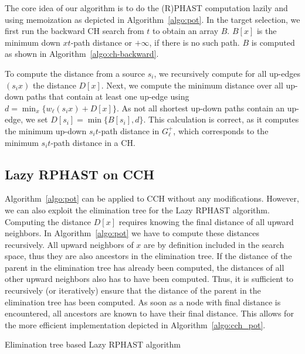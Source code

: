 \documentclass[a4paper,UKenglish,cleveref, autoref, thm-restate]{lipics-v2021}
\begin{document}
The core idea of our algorithm is to do the (R)PHAST computation lazily and using memoization as depicted in Algorithm~\ref{algo:pot}.
In the target selection, we first run the backward CH search from $t$ to obtain an array $B$.
$B[x]$ is the minimum down $xt$-path distance or $+\infty$, if there is no such path.
$B$ is computed as shown in Algorithm~\ref{algo:ch-backward}.

To compute the distance from a source $s_i$, we recursively compute for all up-edges $(s_i x)$ the distance $D[x]$.
Next, we compute the minimum distance over all up-down paths that contain at least one up-edge using $d = \min_x\{w_\ell(s_i x) + D[x]\}$.
As not all shortest up-down paths contain an up-edge, we set $D[s_i] = \min \{ B[s_i], d \}$.
This calculation is correct, as it computes the minimum up-down $s_it$-path distance in $G^+_\ell$, which corresponds to the minimum $s_it$-path distance in a CH.

\subsection{Lazy RPHAST on CCH}

Algorithm~\ref{algo:pot} can be applied to CCH without any modifications.
However, we can also exploit the elimination tree for the Lazy RPHAST algorithm.
Computing the distance $D[x]$ requires knowing the final distance of all upward neighbors.
In Algorithm~\ref{algo:pot} we have to compute these distances recursively.
All upward neighbors of $x$ are by definition included in the search space, thus they are also ancestors in the elimination tree.
If the distance of the parent in the elimination tree has already been computed, the distances of all other upward neighbors also has to have been computed.
Thus, it is sufficient to recursively (or iteratively) ensure that the distance of the parent in the elimination tree has been computed.
As soon as a node with final distance is encountered, all ancestors are known to have their final distance.
This allows for the more efficient implementation depicted in Algorithm~\ref{algo:cch_pot}.

\begin{algorithm2e}
\caption{Elimination tree based Lazy RPHAST algorithm}
\label{algo:cch_pot}
\end{algorithm2e}
\end{document}

